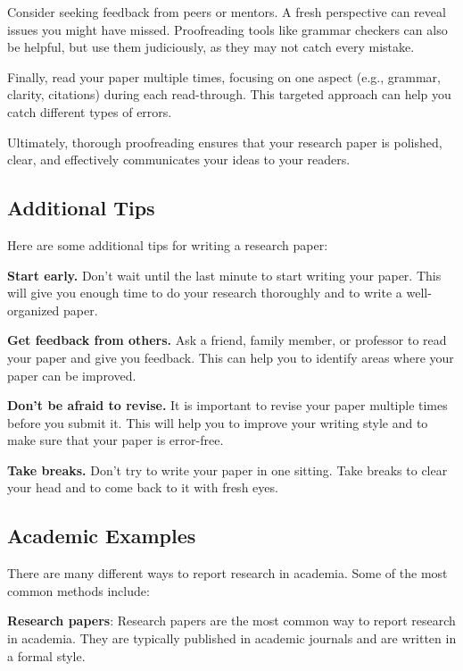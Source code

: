 \documentclass[
  b5paper]{book}
\begin{document}
Consider seeking feedback from peers or mentors. A fresh perspective can reveal issues you might have missed. Proofreading tools like grammar checkers can also be helpful, but use them judiciously, as they may not catch every mistake.

Finally, read your paper multiple times, focusing on one aspect (e.g., grammar, clarity, citations) during each read-through. This targeted approach can help you catch different types of errors.

Ultimately, thorough proofreading ensures that your research paper is polished, clear, and effectively communicates your ideas to your readers.

\hypertarget{additional-tips}{%
\subsection*{Additional Tips}\label{additional-tips}}

Here are some additional tips for writing a research paper:

\textbf{Start early.} Don't wait until the last minute to start writing your paper. This will give you enough time to do your research thoroughly and to write a well-organized paper.

\textbf{Get feedback from others.} Ask a friend, family member, or professor to read your paper and give you feedback. This can help you to identify areas where your paper can be improved.

\textbf{Don't be afraid to revise.} It is important to revise your paper multiple times before you submit it. This will help you to improve your writing style and to make sure that your paper is error-free.

\textbf{Take breaks.} Don't try to write your paper in one sitting. Take breaks to clear your head and to come back to it with fresh eyes.

\hypertarget{academic-examples}{%
\subsection*{Academic Examples}\label{academic-examples}}

There are many different ways to report research in academia. Some of the most common methods include:

\textbf{Research papers}: Research papers are the most common way to report research in academia. They are typically published in academic journals and are written in a formal style.
\end{document}

